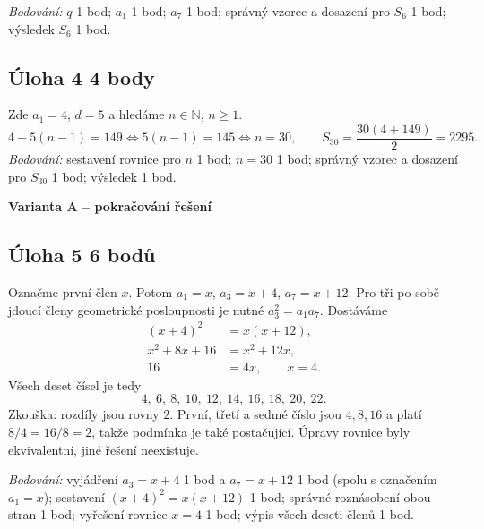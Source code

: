 \documentclass[a4paper,11pt]{article}
\begin{document}
\textit{Bodování:} $q$ 1 bod; $a_1$ 1 bod; $a_7$ 1 bod;
správný vzorec a dosazení pro $S_6$ 1 bod; výsledek $S_6$ 1 bod.

\subsection*{Úloha 4 \hfill 4 body}
Zde $a_1=4$, $d=5$ a hledáme $n\in\mathbb N$, $n\ge1$.
\[
    4+5(n-1)=149 \iff 5(n-1)=145 \iff n=30,
    \qquad S_{30}=\frac{30(4+149)}2=2295.
\]
\textit{Bodování:} sestavení rovnice pro $n$ 1 bod; $n=30$ 1 bod;
správný vzorec a dosazení pro $S_{30}$ 1 bod; výsledek 1 bod.

\newpage
\begin{center}
    {\large\bfseries Varianta A -- pokračování řešení}
\end{center}

\subsection*{Úloha 5 \hfill 6 bodů}
Označme první člen $x$. Potom $a_1=x$, $a_3=x+4$, $a_7=x+12$.
Pro tři po sobě jdoucí členy geometrické posloupnosti je nutné
$a_3^2=a_1a_7$. Dostáváme
\begin{align*}
    (x+4)^2&=x(x+12),\\
    x^2+8x+16&=x^2+12x,\\
    16&=4x,\qquad x=4.
\end{align*}
Všech deset čísel je tedy
\[
    4,\ 6,\ 8,\ 10,\ 12,\ 14,\ 16,\ 18,\ 20,\ 22.
\]
Zkouška: rozdíly jsou rovny $2$. První, třetí a sedmé číslo jsou $4,8,16$
a platí $8/4=16/8=2$, takže podmínka je také postačující.
Úpravy rovnice byly ekvivalentní, jiné řešení neexistuje.

\textit{Bodování:} vyjádření $a_3=x+4$ 1 bod a $a_7=x+12$ 1 bod
(spolu s označením $a_1=x$); sestavení $(x+4)^2=x(x+12)$ 1 bod;
správné roznásobení obou stran 1 bod; vyřešení rovnice $x=4$ 1 bod;
výpis všech deseti členů 1 bod.
\end{document}
